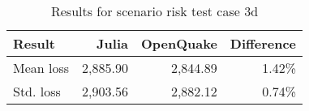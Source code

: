 \begin{table}[h]

\centering
\begin{tabular}{ l r r r }

\hline
\rowcolor{anti-flashwhite}
\bf{Result} & \bf{Julia} & \bf{OpenQuake} & \bf{Difference}\\
\hline
Mean loss & 2,885.90 & 2,844.89 & 1.42\% \\
Std. loss & 2,903.56 & 2,882.12 & 0.74\% \\
\hline
\end{tabular}

\caption{Results for scenario risk test case 3d}
\label{tab:result-sr-3d}
\end{table}